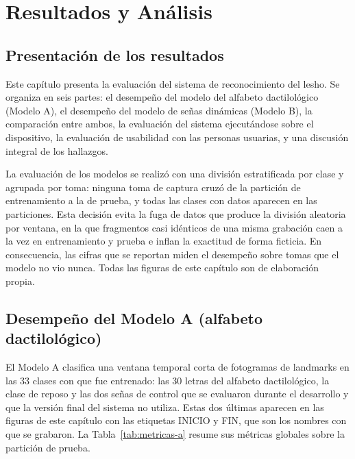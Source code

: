 \chapter[Resultados y Análisis]{Resultados y Análisis}
\label{chap:resultados}

\insertminitoc
\parindent0pt


\section{Presentación de los resultados}

Este capítulo presenta la evaluación del sistema de reconocimiento del \Acrshort{lesho}. Se organiza en seis partes: el desempeño del modelo del alfabeto dactilológico (Modelo A), el desempeño del modelo de señas dinámicas (Modelo B), la comparación entre ambos, la evaluación del sistema ejecutándose sobre el dispositivo, la evaluación de usabilidad con las personas usuarias, y una discusión integral de los hallazgos.

La evaluación de los modelos se realizó con una división estratificada por clase y agrupada por toma: ninguna toma de captura cruzó de la partición de entrenamiento a la de prueba, y todas las clases con datos aparecen en las particiones. Esta decisión evita la fuga de datos que produce la división aleatoria por ventana, en la que fragmentos casi idénticos de una misma grabación caen a la vez en entrenamiento y prueba e inflan la exactitud de forma ficticia. En consecuencia, las cifras que se reportan miden el desempeño sobre tomas que el modelo no vio nunca. Todas las figuras de este capítulo son de elaboración propia.


\section{Desempeño del Modelo A (alfabeto dactilológico)}

El Modelo A clasifica una ventana temporal corta de fotogramas de landmarks en las 33 clases con que fue entrenado: las 30 letras del alfabeto dactilológico, la clase de reposo y las dos señas de control que se evaluaron durante el desarrollo y que la versión final del sistema no utiliza. Estas dos últimas aparecen en las figuras de este capítulo con las etiquetas INICIO y FIN, que son los nombres con que se grabaron. La Tabla~\ref{tab:metricas-a} resume sus métricas globales sobre la partición de prueba.

